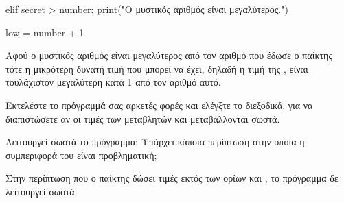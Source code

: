 \documentclass[a4paper,11pt,oneside]{book}
\begin{document}
\begin{step}
\begin{answer}
\begin{pyplain}
    elif secret > number:
        print("Ο μυστικός αριθμός είναι μεγαλύτερος.")
\end{pyplain}
\begin{pynew}
        low = number + 1
\end{pynew}

Αφού ο μυστικός αριθμός είναι μεγαλύτερος από τον αριθμό που έδωσε ο παίκτης τότε η μικρότερη δυνατή τιμή που μπορεί να έχει, δηλαδή η τιμή της , είναι τουλάχιστον μεγαλύτερη κατά 1 από τον αριθμό αυτό.
\end{answer}
\end{step}

\begin{step}
Εκτελέστε το πρόγραμμά σας αρκετές φορές και ελέγξτε το διεξοδικά, για να διαπιστώσετε αν οι τιμές των μεταβλητών  και  μεταβάλλονται σωστά.

Λειτουργεί σωστά το πρόγραμμα; Υπάρχει κάποια περίπτωση στην οποία η συμπεριφορά του είναι προβληματική; 

\begin{answer}
	Στην περίπτωση που ο παίκτης δώσει τιμές εκτός των ορίων  και , το πρόγραμμα δε λειτουργεί σωστά.
\end{answer}
\end{step}
\end{document}
